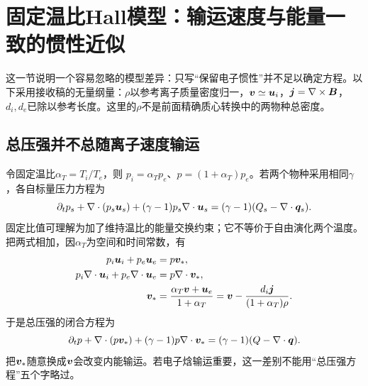 \documentclass[UTF8,a4paper,11pt,openany,fontset=fandol]{ctexbook}
\begin{document}
\section{固定温比Hall模型：输运速度与能量一致的惯性近似}
这一节说明一个容易忽略的模型差异：只写“保留电子惯性”并不足以确定方程。以下采用\citet{L296}接收稿的无量纲量：$\rho$以参考离子质量密度归一，$\bm{v}\simeq\bm{u}_i$，$\bm{j}=\nabla\times\bm{B}$，$d_i,d_e$已除以参考长度。这里的$\rho$不是前面精确质心转换中的两物种总密度。

\subsection{总压强并不总随离子速度输运}
令固定温比$\alpha_T=T_i/T_e$，则
$p_i=\alpha_Tp_e$、$p=(1+\alpha_T)p_e$。若两个物种采用相同$\gamma$，各自标量压力方程为
\begin{equation}
 \partial_tp_s+\nabla\cdot(p_s\bm{u}_s)
 +(\gamma-1)p_s\nabla\cdot\bm{u}_s
 =(\gamma-1)(Q_s-\nabla\cdot\bm{q}_s).
\end{equation}
固定比值可理解为加了维持温比的能量交换约束；它不等价于自由演化两个温度。把两式相加，因$\alpha_T$为空间和时间常数，有
\begin{align}
 p_i\bm{u}_i+p_e\bm{u}_e&=p\bm{v}_*,\\
 p_i\nabla\cdot\bm{u}_i+p_e\nabla\cdot\bm{u}_e&=p\nabla\cdot\bm{v}_*,\\
 \bm{v}_*&=\frac{\alpha_T\bm{v}+\bm{u}_e}{1+\alpha_T}
 =\bm{v}-\frac{d_i\bm{j}}{(1+\alpha_T)\rho}.
\end{align}
于是总压强的闭合方程为
\begin{equation}
 \partial_tp+\nabla\cdot(p\bm{v}_*)
 +(\gamma-1)p\nabla\cdot\bm{v}_*
 =(\gamma-1)(Q-\nabla\cdot\bm{q}).
\end{equation}
把$\bm{v}_*$随意换成$\bm{v}$会改变内能输运。若电子焓输运重要，这一差别不能用“总压强方程”五个字略过。
\end{document}
